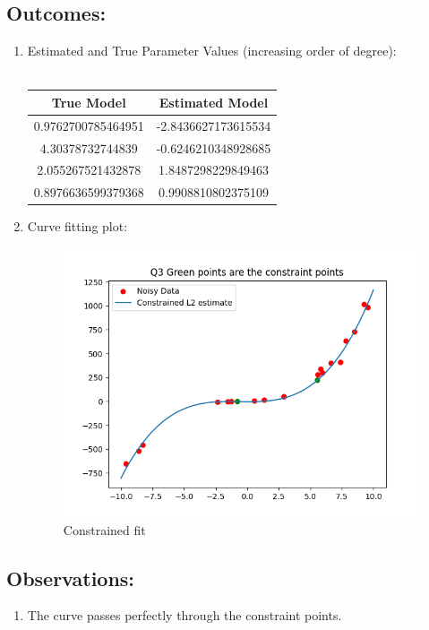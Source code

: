 \documentclass{article}
\begin{document}
\subsection{Outcomes:}
\begin{enumerate}
    \item Estimated and True Parameter Values (increasing order of degree):\\
    \\
    \begin{tabular}{|c|c|} 
        \hline 
       True Model & Estimated Model\\ 
       \hline 
       0.9762700785464951 & -2.8436627173615534\\ 
       \hline 
       4.30378732744839 & -0.6246210348928685\\ 
       \hline 
       2.055267521432878 & 1.8487298229849463\\ 
       \hline 
       0.8976636599379368 & 0.9908810802375109\\ 
       \hline 
    \end{tabular}
\clearpage
    \item Curve fitting plot:\\
    \begin{figure}[h]
        \centering
        \includegraphics[width = 15 cm]{figs/Q3plots.png}
    \caption{Constrained fit}
\end{figure}
\end{enumerate}

\subsection{Observations:}
\begin{enumerate}
    \item The curve passes perfectly through the constraint points.
\end{enumerate}
\end{document}
